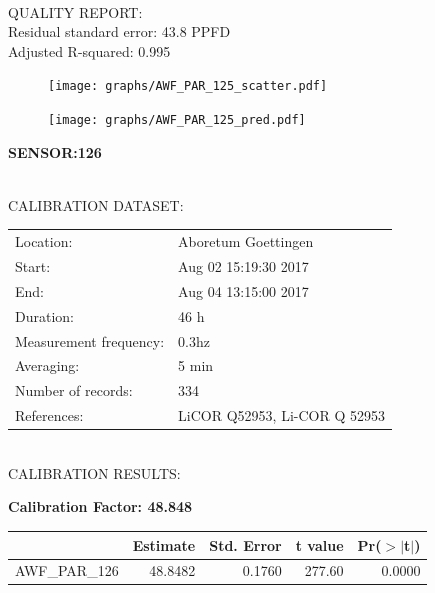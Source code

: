 \documentclass[oneside]{report}
\begin{document}
\hrulefill\\
QUALITY REPORT:\\
Residual standard error: 43.8 PPFD\\
Adjusted R-squared: 0.995



\begin{figure}[H]
  \centering
  \texttt{[image: graphs/AWF\_PAR\_125\_scatter.pdf]}
\end{figure}




\begin{figure}[H]
  \centering
  \texttt{[image: graphs/AWF\_PAR\_125\_pred.pdf]}
\end{figure}

\pagebreak


\begin{center}
\large{\textbf{SENSOR:126}}\\
\end{center}

\hrulefill\\
CALIBRATION DATASET:\\
\begin{table}[h!]
  \centering
  \label{tab:table1}
  \begin{tabular}{ll}
    Location: & Aboretum Goettingen\\ 
    
    
    Start:  & Aug 02 15:19:30 2017 \\
    End:   & Aug 04 13:15:00 2017\\ 
    Duration: & 46 h\\
    Measurement frequency: & 0.3hz\\
    Averaging:  &5 min\\
    Number of records: & 334 \\
    References: & LiCOR Q52953, Li-COR Q 52953 \\
  \end{tabular}
\end{table}

\hrulefill\\
CALIBRATION RESULTS:\\


\begin{center}
\textbf{\large{Calibration Factor: 48.848}}\\
\end{center}
\begin{table}[ht]
\centering
\begin{tabular}{rrrrr}
  \hline
 & Estimate & Std. Error & t value & Pr($>$$|$t$|$) \\ 
  \hline
AWF\_PAR\_126 & 48.8482 & 0.1760 & 277.60 & 0.0000 \\ 
   \hline
\end{tabular}
\end{table}
\end{document}
